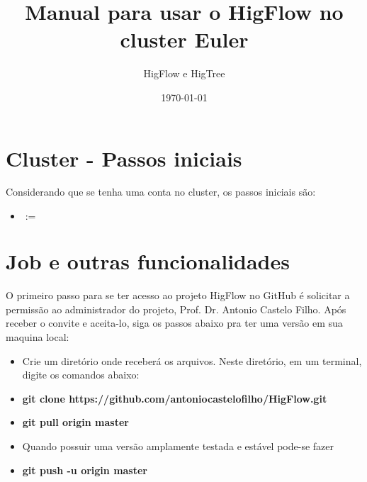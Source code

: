 \documentclass[12pt]{article}
\begin{document}
\title{Manual para usar o HigFlow no cluster Euler}
\author{HigFlow e HigTree}
\date{\today}
\maketitle

\section{Cluster - Passos iniciais}\label{sec:clu_pas_ini}
Considerando que se tenha uma conta no cluster, os passos iniciais são:
\begin{itemize}
	\item \textbf{} $:=$ 	
\end{itemize}

\section{Job e outras funcionalidades}\label{sec:job_fun}

O primeiro passo para se ter acesso ao projeto HigFlow no GitHub é solicitar a permissão ao administrador do projeto, Prof. Dr. Antonio Castelo Filho. Após receber o convite e aceita-lo, siga os passos abaixo pra ter uma versão em sua maquina local:

\begin{itemize}
	\item Crie um diretório onde receberá os arquivos. Neste diretório, em um terminal, digite os comandos abaixo:
	
	\item \textbf{git clone https://github.com/antoniocastelofilho/HigFlow.git}
	
	\item \textbf{git pull origin master}
	
	\item Quando possuir uma versão amplamente testada e estável pode-se fazer 
	
	\item \textbf{git push -u origin master}
	
\end{itemize}

%
%
\end{document}
